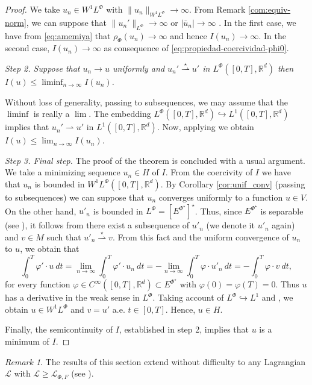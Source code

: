 \documentclass[twoside]{article}
\theoremstyle{remark}
\newtheorem{comentario}{Remark}
\newcommand{\orlnor}{\|_{L^{\Phi}}}
\newcommand{\lphi}{L^{\Phi}}
\newcommand{\wphi}{W^{1}\lphi}
\newcommand{\sobnor}{\|_{W^{1}\lphi}}
\newcommand{\rr}{\mathbb{R}}
\renewcommand{\leq}{\leqslant}
\renewcommand{\geq}{\geqslant}
\newcommand{\epsi}{E^{\Phi^{\star}}}
\begin{document}
\begin{proof}
We take $u_n\in\wphi$ with $\|u_n\sobnor\to\infty$. From Remark \ref{com:equiv-norm}, we can suppose that $\|u_n'\orlnor \to \infty$ or $|\overline{u}_n|\to \infty$ . In the first case, we have from \eqref{eq:amemiya} that $\rho_\Phi(u_n)\to\infty$ and hence  $I(u_n)\to\infty$. In the second case,  $I(u_n)\to\infty$ as consequence of \eqref{eq:propiedad-coercividad-phi0}.





\emph{Step 2. Suppose that $u_n\to u$ uniformly and $u_n'\overset{\star}{\rightharpoonup} u'$ in $\lphi([0,T],\rr^d)$ then
$
I(u)\leq\liminf_{n\to\infty}I(u_n)
$.
}  


  Without loss of generality, passing to subsequences, we may assume that the $\liminf$ is really a $\lim$. The embedding  $\lphi([0,T],\rr^d)\hookrightarrow L^1([0,T],\rr^d)$ implies that  $u_n'\rightharpoonup u' $ in $ L^1([0,T],\rr^d)$.  Now, applying \cite[Th. 3.6]{buttazzo1998one} we obtain $I(u)\leq \lim_{n\to\infty}I(u_n)$.

\emph{Step 3. Final step.}
The proof of the theorem is concluded with a usual argument. We take a minimizing sequence $u_n \in H$ of $I$. 
From the coercivity of $I$ we have that $u_n$ is bounded in $\wphi([0,T],\rr^d)$. By Corollary \ref{cor:unif_conv}  (passing to subsequences) we can suppose that $u_n$ converges uniformly to a function $u\in V$. 
On the other hand, $u'_n$ is bounded in $\lphi=\left[\epsi\right]^\star$. Thus,  
since $E^{\Phi^{\star}}$ is separable (see \cite[Thm. 6.3]{Orliczvectorial2005}), it follows from \cite[Cor. 3.30]{brezis2010functional} 
there exist a subsequence of $u'_n$ (we denote it $u'_n$ again) and $v \in M$ such that $u'_n\overset{\star}{\rightharpoonup}v$. From this fact and the uniform convergence of $u_n$ to $u$, we obtain that
\[
\int_0^T\varphi'\cdot u\ dt=\lim_{n\to\infty}\int_0^T\varphi'\cdot u_n \ dt=
-\lim_{n\to\infty}\int_0^T\varphi\cdot u'_n\ dt=-\int_0^T\varphi\cdot v\ dt,
\]
for every function $\varphi\in C^{\infty}([0,T],\rr^d)\subset\epsi$ with $\varphi(0)= \varphi(T)=0$.
Thus $u$ has a  derivative in the weak sense in $\lphi$. Taking account of 
$\lphi \hookrightarrow L^1$ and \cite[Thms. 2.3 and 2.17 ]{buttazzo1998one}, 
we obtain $u\in \wphi$ and $v=u'$ a.e. $t\in [0,T]$.
Hence, $u \in H$. 

Finally, the semicontinuity of $I$, established in step 2,  implies that $u$ is a minimum of $I$.
\end{proof}


\begin{comentario} The results of this section extend without difficulty to any Lagrangian $\mathcal{L}$ with $\mathcal{L}\geq \mathcal{L}_{\Phi,F}$ (see \cite{ABGMS2015}).
\end{comentario}
\end{document}
